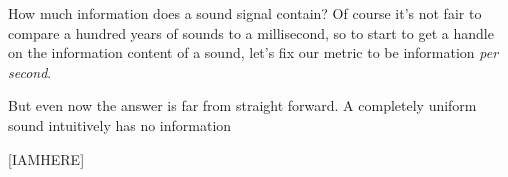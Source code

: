 \documentclass[UTF8]{book}
\begin{document}
\begin{CJK}{UTF8}{gbsn}
How much information does a sound signal contain? Of course it's not fair to compare a hundred years of sounds to a millisecond, so to start to get a handle on the information content of a sound, let's fix our metric to be information \emph{per second}.

But even now the answer is far from straight forward. A completely uniform sound intuitively has no information

[IAMHERE]




\end{CJK}
\end{document}
